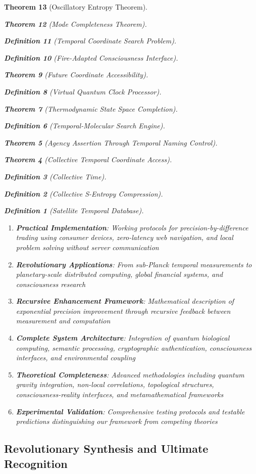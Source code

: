 \documentclass[12pt,a4paper]{article}
\newtheorem{theorem}{Theorem}[section]
\newtheorem{definition}[theorem]{Definition}
\begin{document}
\begin{theorem}[Oscillatory Entropy Theorem]
\begin{theorem}[Mode Completeness Theorem]
\begin{enumerate}
\begin{definition}[Temporal Coordinate Search Problem]
\begin{algorithm}
\begin{definition}[Fire-Adapted Consciousness Interface]
\begin{theorem}[Future Coordinate Accessibility]
\begin{definition}[Virtual Quantum Clock Processor]
\begin{itemize}
\begin{itemize}
\begin{theorem}[Thermodynamic State Space Completion]
\begin{definition}[Temporal-Molecular Search Engine]
\begin{theorem}[Agency Assertion Through Temporal Naming Control]
\begin{remark}
\begin{theorem}[Collective Temporal Coordinate Access]
\begin{definition}[Collective Time]
\begin{definition}[Collective S-Entropy Compression]
\begin{definition}[Satellite Temporal Database]
\begin{algorithm}
\begin{table}[h]
{{\begin{enumerate}
\item \textbf{Practical Implementation}: Working protocols for precision-by-difference trading using consumer devices, zero-latency web navigation, and local problem solving without server communication

\item \textbf{Revolutionary Applications}: From sub-Planck temporal measurements to planetary-scale distributed computing, global financial systems, and consciousness research
\item \textbf{Recursive Enhancement Framework}: Mathematical description of exponential precision improvement through recursive feedback between measurement and computation
\item \textbf{Complete System Architecture}: Integration of quantum biological computing, semantic processing, cryptographic authentication, consciousness interfaces, and environmental coupling
\item \textbf{Theoretical Completeness}: Advanced methodologies including quantum gravity integration, non-local correlations, topological structures, consciousness-reality interfaces, and metamathematical frameworks
\item \textbf{Experimental Validation}: Comprehensive testing protocols and testable predictions distinguishing our framework from competing theories
\end{enumerate}

\subsection{Revolutionary Synthesis and Ultimate Recognition}

}}
\end{table}
\end{algorithm}
\end{definition}
\end{definition}
\end{definition}
\end{theorem}
\end{remark}
\end{theorem}
\end{definition}
\end{theorem}
\end{itemize}
\end{itemize}
\end{definition}
\end{theorem}
\end{definition}
\end{algorithm}
\end{definition}
\end{enumerate}
\end{theorem}
\end{theorem}
\end{document}
